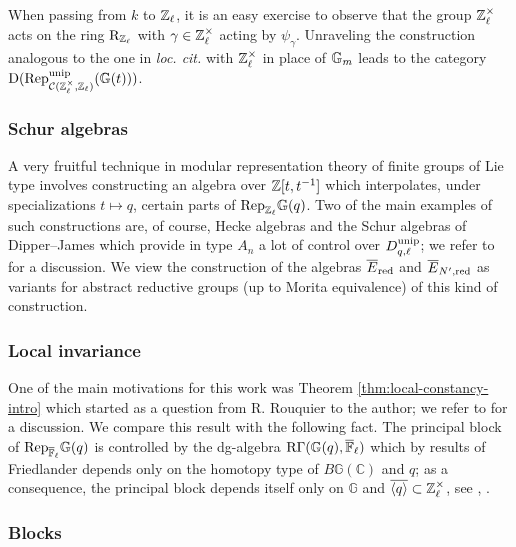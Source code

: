 \documentclass[a4paper, 10pt, oneside, reqno]{amsart}
\theoremstyle{plain}
\theoremstyle{definition}
\theoremstyle{remark}
\newcommand{\Gbb}{\mathbb{G}}
\newcommand{\RR}{\mathrm{R}}
\newcommand{\C}{\mathbb{C}}
\begin{document}
When passing from $k$ to $\mathbb{Z}_{\ell}$, it is an easy exercise to observe that the group $\mathbb{Z}_{\ell}^{\times}$ acts on the ring $\RR_{\Zl}$ with $\gamma \in \mathbb{Z}_{\ell}^{\times}$ acting by $\psi_{\gamma}$. Unraveling the construction analogous to the one in \emph{loc. cit.} with $\mathbb{Z}_{\ell}^{\times}$ in place of $\mathbb{G}_m$ leads to the category $\DD(\Rep_{\Ccal(\Zl^{\times}, \Zl)}^{\unip}(\Gbb(t)))$. 

\subsubsection{Schur algebras}

A very fruitful technique in modular representation theory of finite groups of Lie type involves constructing an algebra over $\mathbb{Z}[t,t^{-1}]$ which interpolates, under specializations $t \mapsto q$, certain parts of $\Rep_{\Zl}\Gbb(q)$. Two of the main examples of such constructions are, of course, Hecke algebras and the Schur algebras of Dipper--James \cite{DipperJamesQSchur} which provide in type $A_n$ a lot of control over $D_{q,\ell}^{\mathrm{unip}}$; we refer to \cite[Section 5.3.4]{RouquierModularLie} for a discussion. We view the construction of the algebras $\overline{E}_{\mathrm{red}}$ and $\overline{E}_{N',\mathrm{red}}$ as variants for abstract reductive groups (up to Morita equivalence) of this kind of construction.

\subsubsection{Local invariance} 

One of the main motivations for this work was Theorem \ref{thm:local-constancy-intro} which started as a question from R. Rouquier to the author; we refer to \cite[Section 6.1]{RouquierModularLie} for a discussion. We compare this result with the following fact. The principal block of $\Rep_{\Flb}\Gbb(q)$ is controlled by the dg-algebra $\RGamma(\Gbb(q), \Flb)$ which by results of Friedlander \cite[Theorem 12.2]{FriedlanderEtaleHomotopy} depends only on the homotopy type of $B\Gbb(\C)$ and $q$; as a consequence, the principal block depends itself only on $\Gbb$ and $\overline{\langle q \rangle} \subset \mathbb{Z}_{\ell}^{\times}$, see \cite[Section 6.1.2]{RouquierModularLie}, \cite[Section 3]{BrotoMollerOliver}.

\subsubsection{Blocks}
\end{document}
